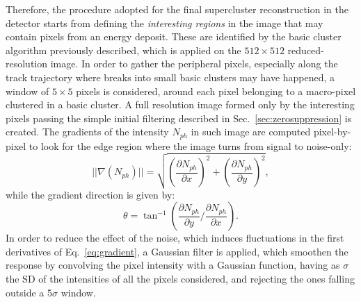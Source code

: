 Therefore, the procedure adopted for the final supercluster
reconstruction in the
\lemon detector starts from defining the \textit{interesting regions}
in the image that may contain pixels from an energy deposit. These are
identified by the basic cluster algorithm \idbscan previously
described, which is applied on the $512{\times}512$ reduced-resolution
image. In order to gather the peripheral pixels, especially along the
track trajectory where breaks into small basic clusters may have
happened, a window of $5{\times}5$ pixels is considered, around each
pixel belonging to a macro-pixel clustered in a basic cluster. A full
resolution image formed only by the interesting pixels passing the
simple initial filtering described in Sec.~\ref{sec:zerosuppression}
is created.  The gradients of the intensity $N_{ph}$ in such image are
computed pixel-by-pixel to look for the edge region where the image
turns from signal to noise-only:
%
\begin{equation}
\label{eq:gradient}
\vert\vert\nabla(N_{ph})\vert\vert =
\sqrt{\left(\frac{\partial N_{ph}}{\partial x}\right)^2
  +\left(\frac{\partial N_{ph}}{\partial y}\right)^2},
\end{equation}
%
while the gradient direction is given by:
\begin{equation}
  \label{eq:graddir}
  \theta = \tan^{-1}\left(\frac{\partial N_{ph}}{\partial y}/\frac{\partial N_{ph}}{\partial x}\right).
\end{equation}
%
In order to reduce the effect of the noise, which induces fluctuations
in the first derivatives of Eq.~\ref{eq:gradient}, a Gaussian filter
is applied, which smoothen the response by convolving the pixel
intensity with a Gaussian function, having as $\sigma$ the SD of the
intensities of all the pixels considered, and rejecting the ones
falling outside a 5$\sigma$ window.

